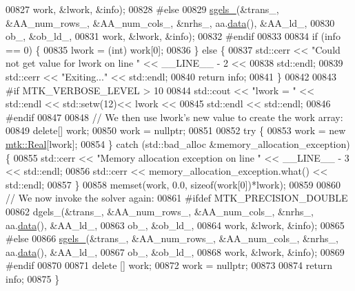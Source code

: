 \begin{DoxyCode}
00827          work, &lwork, &info);
00828 \textcolor{preprocessor}{  #else}
00829   \hyperlink{namespacemtk_ada6df1b733204aa7ff0b1ec7556288f9}{sgels\_}(&trans\_, &AA\_num\_rows\_, &AA\_num\_cols\_, &nrhs\_, aa.\hyperlink{classmtk_1_1DenseMatrix_a0c33b8a9e01d157c61ddbdf807c25d84}{data}(), &AA\_ld\_,
00830          ob\_, &ob\_ld\_,
00831          work, &lwork, &info);
00832 \textcolor{preprocessor}{  #endif}
00833 
00834   \textcolor{keywordflow}{if} (info == 0) \{
00835     lwork = (int) work[0];
00836   \} \textcolor{keywordflow}{else} \{
00837     std::cerr << \textcolor{stringliteral}{"Could not get value for lwork on line "} << \_\_LINE\_\_ - 2 <<
00838       std::endl;
00839     std::cerr << \textcolor{stringliteral}{"Exiting..."} << std::endl;
00840     \textcolor{keywordflow}{return} info;
00841   \}
00842 
00843 \textcolor{preprocessor}{  #if MTK\_VERBOSE\_LEVEL > 10}
00844   std::cout << \textcolor{stringliteral}{"lwork = "} << std::endl << std::setw(12)<< lwork <<
00845     std::endl << std::endl;
00846 \textcolor{preprocessor}{  #endif}
00847 
00848   \textcolor{comment}{// We then use lwork's new value to create the work array:}
00849   \textcolor{keyword}{delete}[] work;
00850   work = \textcolor{keyword}{nullptr};
00851 
00852   \textcolor{keywordflow}{try} \{
00853     work = \textcolor{keyword}{new} \hyperlink{group__c01-roots_gac080bbbf5cbb5502c9f00405f894857d}{mtk::Real}[lwork];
00854   \} \textcolor{keywordflow}{catch} (std::bad\_alloc &memory\_allocation\_exception) \{
00855     std::cerr << \textcolor{stringliteral}{"Memory allocation exception on line "} << \_\_LINE\_\_ - 3 << std::endl;
00856     std::cerr << memory\_allocation\_exception.what() << std::endl;
00857   \}
00858   memset(work, 0.0, \textcolor{keyword}{sizeof}(work[0])*lwork);
00859 
00860   \textcolor{comment}{// We now invoke the solver again:}
00861 \textcolor{preprocessor}{  #ifdef MTK\_PRECISION\_DOUBLE}
00862   dgels\_(&trans\_, &AA\_num\_rows\_, &AA\_num\_cols\_, &nrhs\_, aa.\hyperlink{classmtk_1_1DenseMatrix_a0c33b8a9e01d157c61ddbdf807c25d84}{data}(), &AA\_ld\_,
00863          ob\_, &ob\_ld\_,
00864          work, &lwork, &info);
00865 \textcolor{preprocessor}{  #else}
00866   \hyperlink{namespacemtk_ada6df1b733204aa7ff0b1ec7556288f9}{sgels\_}(&trans\_, &AA\_num\_rows\_, &AA\_num\_cols\_, &nrhs\_, aa.\hyperlink{classmtk_1_1DenseMatrix_a0c33b8a9e01d157c61ddbdf807c25d84}{data}(), &AA\_ld\_,
00867          ob\_, &ob\_ld\_,
00868          work, &lwork, &info);
00869 \textcolor{preprocessor}{  #endif}
00870 
00871   \textcolor{keyword}{delete} [] work;
00872   work = \textcolor{keyword}{nullptr};
00873 
00874   \textcolor{keywordflow}{return} info;
00875 \}
\end{DoxyCode}
